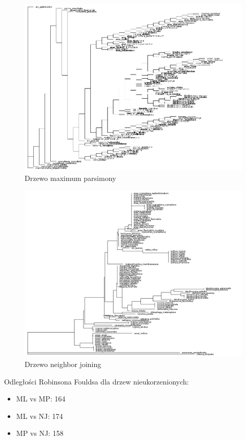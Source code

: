 \documentclass[12pt]{article}
\begin{document}
\begin{figure}[H]
\begin{center}
\includegraphics[width=\textwidth]{mp}
\caption{Drzewo maximum parsimony}
\end{center}
\end{figure}

\begin{figure}[H]
\begin{center}
\includegraphics[width=\textwidth]{nj}
\caption{Drzewo neighbor joining}
\end{center}
\end{figure}

Odległości Robinsona Fouldsa dla drzew nieukorzenionych:
\begin{itemize}
\item ML vs MP: 164
\item ML vs NJ: 174
\item MP vs NJ: 158
\end{itemize}
\end{document}
